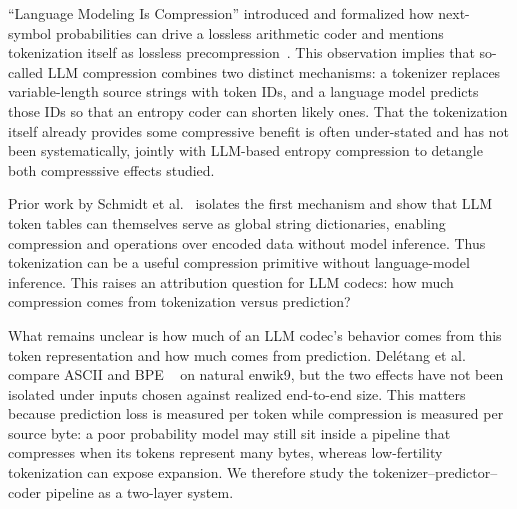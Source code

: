 \documentclass{article}
\begin{document}


``Language Modeling Is Compression'' introduced and formalized how next-symbol probabilities can drive a lossless arithmetic coder and mentions tokenization itself as lossless precompression~\citep{deletang2024language}. This observation implies that so-called LLM compression combines two distinct mechanisms: a tokenizer replaces variable-length source strings with token IDs, and a language model predicts those IDs so that an entropy coder can shorten likely ones. That the tokenization itself already provides some compressive benefit is often under-stated and has not been systematically, jointly with LLM-based entropy compression to detangle both compresssive effects studied. 


Prior work by Schmidt et al.~\citep{schmidt2026token} isolates the first mechanism and show that LLM token tables can themselves serve as global string dictionaries, enabling compression and operations over encoded data without model inference. Thus tokenization can be a useful compression primitive without language-model inference. This raises an attribution question for LLM codecs: how much compression comes from tokenization versus prediction?



What remains unclear is how much of an LLM codec's behavior comes from this token representation and how much comes from prediction. Delétang et al. compare ASCII and BPE ~\citep{sennrich2016bpe} on natural enwik9, but the two effects have not been isolated under inputs chosen against realized end-to-end size. This matters because prediction loss is measured per token while compression is measured per source byte: a poor probability model may still sit inside a pipeline that compresses when its tokens represent many bytes, whereas low-fertility tokenization can expose expansion. We therefore study the tokenizer--predictor--coder pipeline as a two-layer system.
\end{document}
